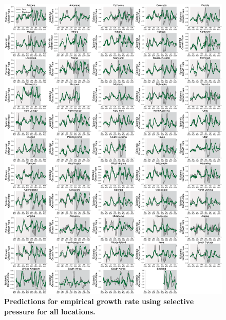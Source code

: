 \documentclass[11pt,oneside,letterpaper]{article}
\begin{document}
\begin{figure}[t!]
    \centering
    \includegraphics[width=1.0\textwidth=0.01]{./supplementary_figures/empirical_growth_rate_predictions_all.png}
    \caption{
      \textbf{Predictions for empirical growth rate using selective pressure for all locations.}
    }
    \label{fig:empirical_growth_rate_predictions_all}
\end{figure}
\end{document}
